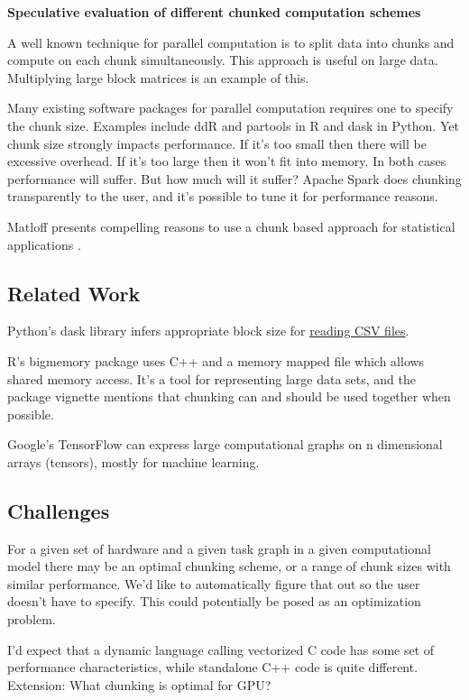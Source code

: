 \documentclass[12pt]{article}
\begin{document}
\textbf{Speculative evaluation of different chunked computation schemes}

A well known technique for parallel computation is to split data into
chunks and compute on each chunk simultaneously. This approach 
is useful on large data. Multiplying large block matrices is an example of this.

Many existing software packages for parallel computation requires one to specify the
chunk size. Examples include ddR \cite{R-ddR} and partools
\cite{R-partools} in R and dask in Python.
Yet chunk size strongly impacts
performance. If it's too small then there will be excessive overhead. If
it's too large then it won't fit into memory. In both cases performance
will suffer. But how much will it suffer?
Apache Spark does chunking transparently to the user, and it's possible to
tune it for performance reasons.

Matloff presents compelling reasons to use a chunk based
approach for statistical applications \cite{matloff2014software}.

\subsection{Related Work}

Python's dask library infers appropriate block size for
\href{https://github.com/dask/dask/pull/1328}{reading CSV files}.

R's bigmemory package uses C++ and a memory mapped file which allows shared
memory access. \cite{kane2010bigmemory} It's a tool for representing large
data sets, and the package vignette mentions that chunking can and should
be used together when possible.

Google's TensorFlow can express large computational graphs on n dimensional
arrays (tensors), mostly for machine learning.

\subsection{Challenges}

For a given set of hardware and a given task graph in a given
computational model there may be
an optimal chunking scheme, or a range of chunk sizes with similar performance.
We'd like to automatically figure that out so the user doesn't have to
specify. This could potentially be posed as an optimization problem.

I'd expect that a dynamic language calling vectorized C code has some set
of performance characteristics, while standalone C++ code is quite
different.
Extension: What chunking is optimal for GPU?
\end{document}
